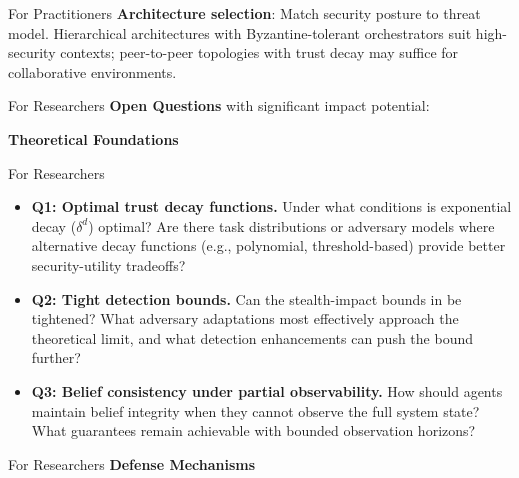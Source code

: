 \documentclass[
  ignorenonframetext,
]{beamer}
\providecommand{\cref}[1]{\texttt{\detokenize{#1}}}
\begin{document}
\begin{frame}[allowframebreaks]{For Practitioners}
\textbf{Architecture selection}: Match security posture to threat model.
Hierarchical architectures with Byzantine-tolerant orchestrators suit
high-security contexts; peer-to-peer topologies with trust decay may
suffice for collaborative environments.
\end{frame}

\begin{frame}[allowframebreaks]{For Researchers}
\protect{}\label{for-researchers}
\textbf{Open Questions} with significant impact potential:

\textbf{Theoretical Foundations}

\end{frame}

\begin{frame}[allowframebreaks]{For Researchers}
\begin{itemize}
\item
  \textbf{Q1: Optimal trust decay functions.} Under what conditions is
  exponential decay (\(\delta^d\)) optimal? Are there task distributions
  or adversary models where alternative decay functions (e.g.,
  polynomial, threshold-based) provide better security-utility
  tradeoffs?
\item
  \textbf{Q2: Tight detection bounds.} Can the stealth-impact bounds in
  \cref{thm:stealth-impact} be tightened? What adversary adaptations
  most effectively approach the theoretical limit, and what detection
  enhancements can push the bound further?
\item
  \textbf{Q3: Belief consistency under partial observability.} How
  should agents maintain belief integrity when they cannot observe the
  full system state? What guarantees remain achievable with bounded
  observation horizons?
\end{itemize}

\end{frame}

\begin{frame}[allowframebreaks]{For Researchers}
\textbf{Defense Mechanisms}

\end{frame}
\end{document}
